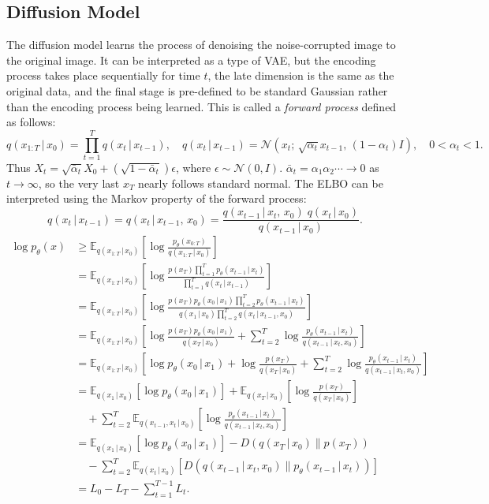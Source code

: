 \subsection{Diffusion Model}
The diffusion model learns the process of denoising the noise-corrupted image to the original image. It can be interpreted as a type of VAE, but the encoding process takes place sequentially for time $t$, the late dimension is the same as the original data, and the final stage is pre-defined to be standard Gaussian rather than the encoding process being learned. This is called a \emph{forward process} defined as follows:
\[q(x_{1:T}\,|\,x_0) = \prod_{t=1}^T q(x_t\,|\,x_{t-1}), \quad
q(x_t\,|\,x_{t-1}) = \mathcal{N}(x_t;\,\sqrt{\alpha_t}x_{t-1},\, (1-\alpha_t)I),\quad0<\alpha_t<1.\] Thus $X_t=\sqrt{\bar{\alpha}_t}X_0+(\sqrt{1-\bar{\alpha}_t})\epsilon$, where $\epsilon\sim\mathcal{N}(0,I)$. $\bar{\alpha}_t=\alpha_1\alpha_2\cdots\to0$ as $t\to\infty$, so the very last $x_T$ nearly follows standard normal. The ELBO can be interpreted using the Markov property of the forward process:
\[
q(x_t\,|\,x_{t-1}) = q(x_t\,|\,x_{t-1},\,x_0)
= \frac{q(x_{t-1}\,|\,x_t,\,x_0)\;q(x_t\,|\,x_0)}{q(x_{t-1}\,|\,x_0)}.
\]
\[\begin{aligned}
\log p_\theta(x) &\geq \mathbb{E}_{q(x_{1:T} \,|\, x_0)} \left[ \log \frac{p_{\theta}(x_{0:T})}{q(x_{1:T} \,|\, x_0)} \right] \\
&= \mathbb{E}_{q(x_{1:T} \,|\, x_0)} \left[ \log \frac{p(x_T) \prod_{t=1}^{T} p_\theta(x_{t-1} \,|\, x_t)}{\prod_{t=1}^{T} q(x_t \,|\, x_{t-1})} \right] \\
&= \mathbb{E}_{q(x_{1:T} \,|\, x_0)} \left[ \log \frac{p(x_T) p_\theta(x_0 \,|\, x_1) \prod_{t=2}^{T} p_\theta(x_{t-1} \,|\, x_t)}{q(x_1 \,|\, x_0) \prod_{t=2}^{T} q(x_t \,|\, x_{t-1}, x_0)} \right] \\
&= \mathbb{E}_{q(x_{1:T} \,|\, x_0)} \left[ \log \frac{p(x_T) p_\theta(x_0 \,|\, x_1)}{q(x_T \,|\, x_0)} + \sum_{t=2}^{T} \log \frac{p_\theta(x_{t-1} \,|\, x_t)}{q(x_{t-1} \,|\, x_t, x_0)} \right] \\
&= \mathbb{E}_{q(x_{1:T} \,|\, x_0)} \left[ \log p_\theta(x_0 \,|\, x_1) + \log \frac{p(x_T)}{q(x_T \,|\, x_0)} + \sum_{t=2}^{T} \log \frac{p_\theta(x_{t-1} \,|\, x_t)}{q(x_{t-1} \,|\, x_t, x_0)} \right] \\
&= \mathbb{E}_{q(x_1 \,|\, x_0)} [\log p_\theta(x_0 \,|\, x_1)] + \mathbb{E}_{q(x_T \,|\, x_0)} \left[ \log \frac{p(x_T)}{q(x_T \,|\, x_0)} \right] \\
&\quad + \sum_{t=2}^{T} \mathbb{E}_{q(x_{t-1}, x_t \,|\, x_0)} \left[ \log \frac{p_\theta(x_{t-1} \,|\, x_t)}{q(x_{t-1} \,|\, x_t, x_0)} \right] \\
&= \mathbb{E}_{q(x_1 \,|\, x_0)} [\log p_\theta(x_0 \,|\, x_1)] - D(q(x_T \,|\, x_0) \| p(x_T)) \\
&\quad - \sum_{t=2}^{T} \mathbb{E}_{q(x_t \,|\, x_0)} \left[ D(q(x_{t-1} \,|\, x_t, x_0) \| p_\theta(x_{t-1} \,|\, x_t)) \right] \\
&= L_0 - L_T - \sum_{t=1}^{T-1} L_t.
\end{aligned}
\]
